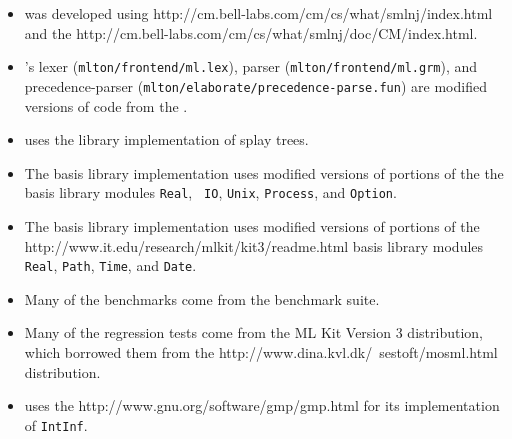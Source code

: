 \begin{itemize}

\item
{\mlton} was developed using
		  {http://cm.bell-labs.com/cm/cs/what/smlnj/index.html}
and the
		  {http://cm.bell-labs.com/cm/cs/what/smlnj/doc/CM/index.html}.

\item
{\mlton}'s lexer ({\tt mlton/frontend/ml.lex}), 
parser ({\tt mlton/frontend/ml.grm}),
and precedence-parser ({\tt mlton/elaborate/precedence-parse.fun})
are modified versions of code from the {\smlnj}.

\item
{\mlton} uses the {\smlnj} library implementation of splay trees.

\item
The {\mlton} basis library implementation uses modified versions of
portions of the the {\smlnj} basis library modules {\tt Real}, {\tt
IO}, {\tt Unix}, {\tt Process}, and {\tt Option}.

\item
The {\mlton} basis library implementation uses modified versions of
portions of the
		  {http://www.it.edu/research/mlkit/kit3/readme.html}
basis library modules {\tt Real}, {\tt Path}, {\tt Time}, and
{\tt Date}.

\item
Many of the benchmarks come from the {\smlnj} benchmark suite.

\item
Many of the regression tests come from the ML Kit Version 3 distribution, which
borrowed them from the
		  {http://www.dina.kvl.dk/~sestoft/mosml.html}
distribution.

\item
{\mlton} uses the
		  {http://www.gnu.org/software/gmp/gmp.html}
for its implementation of {\tt IntInf}.

\end{itemize}
